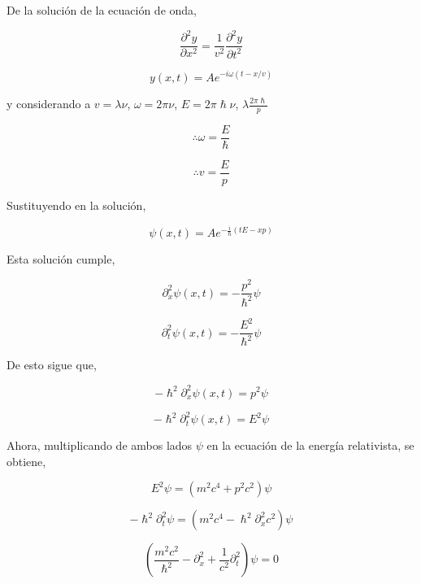 \documentclass[12pt,a4paper]{article}
\begin{document}
\begin{enumerate}
De la solución de la ecuación de onda, 


\[
\frac{\partial^{2} y}{\partial x^{2}} = \frac{1}{v^{2}} \frac{\partial^{2} y}{\partial t^{2}} 
\]


\[
y(x, t) = A e^{-i\omega(t-x/v)}
\]

y considerando a $ v = \lambda \nu $, $ \omega = 2\pi\nu $, $ E = 2\pi\hslash \nu $, $ \lambda\frac{2\pi\hslash}{p} $

\[
\therefore \omega = \frac{E}{\hslash}
\]

\[
\therefore v = \frac{E}{p}
\]

Sustituyendo en la solución,

\[
\psi(x, t) = A e^{-\frac{i}{\hslash}(tE-x p)}
\]

Esta solución cumple, 

\[
\partial_{x}^{2}\psi(x, t) = -\frac{p^{2}}{\hslash^{2}}\psi
\]

\[
\partial_{t}^{2}\psi(x, t) = -\frac{E^{2}}{\hslash^{2}}\psi
\]

De esto sigue que, 

\[
-\hslash^{2}\partial_{x}^{2}\psi(x, t) = p^{2}\psi
\]

\[
-\hslash^{2}\partial_{t}^{2}\psi(x, t) = E^{2}\psi
\]

Ahora, multiplicando de ambos lados $ \psi $ en la ecuación de la energía relativista, se obtiene,

\[
E^{2}\psi = (m^{2} c^{4} + p^{2} c^{2})\psi
\]

\[
-\hslash^{2}\partial_{t}^{2}\psi = (m^{2} c^{4} - \hslash^{2}\partial_{x}^{2} c^{2})\psi
\]

\[
\left( \frac{m^{2} c^{2}}{\hslash^{2}} - \partial_{x}^{2} + \frac{1}{c^{2}}\partial_{t}^{2} \right)\psi = 0
\]



\end{enumerate}
\end{document}
